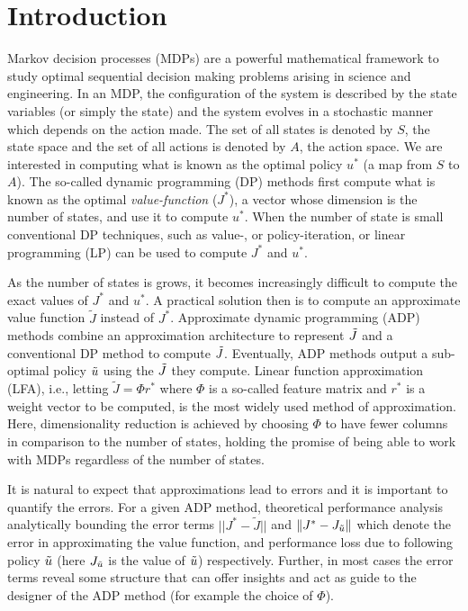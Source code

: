 \section{Introduction}
Markov decision processes (MDPs) are a powerful mathematical framework to study optimal sequential decision making problems  arising in science and engineering. In an MDP, the configuration of the system is described by the state variables (or simply the state) and the system evolves in a stochastic manner which depends on the action made. The set of all states is denoted by $S$, the state space and the set of all actions is denoted by $A$, the action space.
We are interested in computing what is known as the optimal policy $u^*$ (a map from $S$ to $A$). The so-called dynamic programming (DP) methods first compute what is known as the optimal \emph{value-function} ($J^*$), a vector whose dimension is the number of states, and use it to compute $u^*$. When the number of state is small conventional DP techniques, such as value-, or policy-iteration, or linear programming (LP) can be used to compute $J^*$ and $u^*$\cite{BertB}.\par
As the number of states is grows, it becomes increasingly difficult to compute the exact values of $J^*$ and $u^*$. A practical solution then is to compute an approximate value function $\tilde{J}$ instead of $J^*$. Approximate dynamic programming (ADP) methods combine an approximation architecture to represent $\tilde{J}$ and a conventional DP method to compute $\tilde{J}$. Eventually, ADP methods output a sub-optimal policy $\tilde{u}$ using the $\tilde{J}$ they compute. %
Linear function approximation (LFA), i.e., letting $\tilde{J}=\Phi r^*$ where $\Phi$ is a so-called feature matrix and $r^*$ is a weight vector to be computed, is the most widely used method of approximation. Here, dimensionality reduction is achieved by choosing $\Phi$ to have fewer columns in comparison to the number of states, holding the promise of being able to work with MDPs regardless of the number of states.\par
It is natural to expect that approximations lead to errors and it is important to quantify the errors. For a given ADP method, theoretical performance analysis analytically bounding the error terms $||J^*-\tilde{J}||$  and $\|J^*-J_{\tilde{u}}\|$ which denote the error in approximating the value function, and performance loss due to following policy $\tilde{u}$ (here $J_{\tilde{u}}$ is the value of $\tilde{u}$) respectively. Further, in most cases the error terms reveal some structure that can offer insights and act as guide to the designer of the ADP method (for example the choice of $\Phi$). \par

